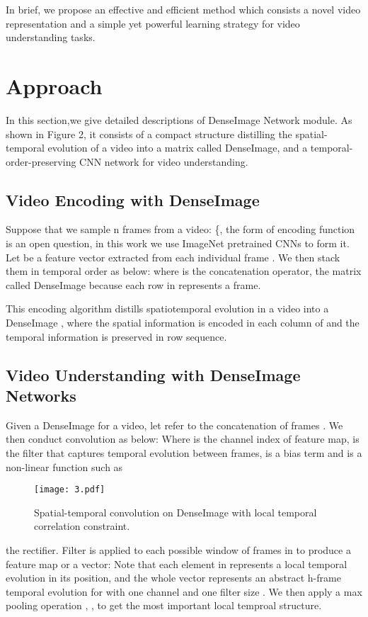 \documentclass{article}
\begin{document}
In brief, we propose an effective and efficient method which consists a novel video representation and a simple yet powerful learning strategy for video understanding tasks.

\section{Approach}
In this section,we give detailed descriptions of DenseImage Network module. As shown in Figure 2, it consists of a compact structure distilling the spatial-temporal evolution of a video into a matrix called DenseImage, and a temporal-order-preserving CNN network for video understanding.

\subsection{Video Encoding with DenseImage}
Suppose that we  sample n  frames from a video: \{, the form of encoding function  is an open question, in this work we use ImageNet pretrained CNNs to form it. Let   be a feature vector extracted from each individual frame .  We then stack them in temporal order as below:  where  is the concatenation operator, the matrix  called DenseImage because each row in  represents a frame. 

This encoding algorithm distills spatiotemporal evolution in a video into a DenseImage , where the spatial information is encoded in each column of   and the temporal information is preserved in row sequence.
\subsection{Video Understanding with DenseImage Networks}
Given a DenseImage  for a video, let  refer to the concatenation of frames . We then conduct convolution as below:  Where  is the channel index of feature map,  is the filter that captures temporal evolution between  frames,  is a bias term and  is a non-linear function such as 
\begin{figure}
	\begin{center}
		\texttt{[image: 3.pdf]}
		\caption{Spatial-temporal convolution on DenseImage with local temporal correlation constraint.}
		\label{Figure 2.}
	\end{center}
	\vspace{-0.5em}
\end{figure}
the rectifier. Filter  is applied to each possible window of frames in  to produce a feature map or a vector:  Note that each element in  represents a local temporal evolution in its position, and the whole vector  represents an abstract h-frame temporal evolution for  with one channel  and one filter size . We then apply a max pooling operation ,  ,  to get the most important local temproal structure.
\end{document}
